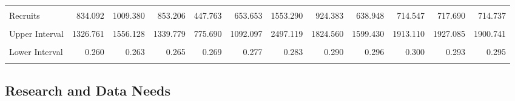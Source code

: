 \documentclass[11pt,
  english,
  a4paper,
]{article}
\begin{document}
\begin{table}[H]
{\begin{tabular}[t]{lrrrrrrrrrrr}
\cellcolor{gray!6}{Upper Interval} & \cellcolor{gray!6}{679.144} & \cellcolor{gray!6}{679.244} & \cellcolor{gray!6}{677.883} & \cellcolor{gray!6}{681.312} & \cellcolor{gray!6}{694.651} & \cellcolor{gray!6}{709.851} & \cellcolor{gray!6}{729.633} & \cellcolor{gray!6}{749.017} & \cellcolor{gray!6}{765.739} & \cellcolor{gray!6}{769.387} & \cellcolor{gray!6}{781.181}\\
Recruits & 834.092 & 1009.380 & 853.206 & 447.763 & 653.653 & 1553.290 & 924.383 & 638.948 & 714.547 & 717.690 & 714.737\\
\addlinespace
\cellcolor{gray!6}{Lower Interval} & \cellcolor{gray!6}{524.367} & \cellcolor{gray!6}{654.733} & \cellcolor{gray!6}{543.344} & \cellcolor{gray!6}{258.469} & \cellcolor{gray!6}{391.231} & \cellcolor{gray!6}{966.197} & \cellcolor{gray!6}{468.323} & \cellcolor{gray!6}{255.250} & \cellcolor{gray!6}{266.883} & \cellcolor{gray!6}{267.284} & \cellcolor{gray!6}{268.763}\\
Upper Interval & 1326.761 & 1556.128 & 1339.779 & 775.690 & 1092.097 & 2497.119 & 1824.560 & 1599.430 & 1913.110 & 1927.085 & 1900.741\\
\cellcolor{gray!6}{Fraction Unfished} & \cellcolor{gray!6}{0.438} & \cellcolor{gray!6}{0.439} & \cellcolor{gray!6}{0.438} & \cellcolor{gray!6}{0.441} & \cellcolor{gray!6}{0.450} & \cellcolor{gray!6}{0.459} & \cellcolor{gray!6}{0.471} & \cellcolor{gray!6}{0.482} & \cellcolor{gray!6}{0.491} & \cellcolor{gray!6}{0.489} & \cellcolor{gray!6}{0.495}\\
Lower Interval & 0.260 & 0.263 & 0.265 & 0.269 & 0.277 & 0.283 & 0.290 & 0.296 & 0.300 & 0.293 & 0.295\\
\cellcolor{gray!6}{Upper Interval} & \cellcolor{gray!6}{0.616} & \cellcolor{gray!6}{0.614} & \cellcolor{gray!6}{0.611} & \cellcolor{gray!6}{0.613} & \cellcolor{gray!6}{0.624} & \cellcolor{gray!6}{0.636} & \cellcolor{gray!6}{0.653} & \cellcolor{gray!6}{0.669} & \cellcolor{gray!6}{0.683} & \cellcolor{gray!6}{0.686} & \cellcolor{gray!6}{0.695}\\
\bottomrule
\end{tabular}}
\end{table}


\hypertarget{research-and-data-needs}{%
\subsection*{Research and Data Needs}\label{research-and-data-needs}}
\end{document}
